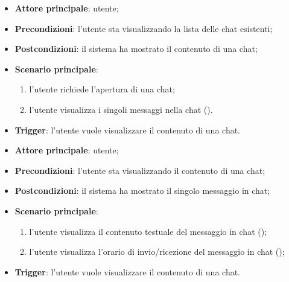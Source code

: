 \documentclass[10pt, a4paper]{article}
\begin{document}
    \begin{itemize}
        \item \textbf{Attore principale}: utente;
        \item \textbf{Precondizioni}: l’utente sta visualizzando la lista delle chat esistenti;
        \item \textbf{Postcondizioni}: il sistema ha mostrato il contenuto di una chat;
        \item \textbf{Scenario principale}:
            \begin{enumerate}
                \item l’utente richiede l’apertura di una chat;
                \item l'utente visualizza i singoli messaggi nella chat ().
            \end{enumerate}
        \item \textbf{Trigger}: l’utente vuole visualizzare il contenuto di una chat.
    \end{itemize}

    \begin{itemize}
        \item \textbf{Attore principale}: utente;
        \item \textbf{Precondizioni}: l’utente sta visualizzando il contenuto di una chat;
        \item \textbf{Postcondizioni}: il sistema ha mostrato il singolo messaggio in chat;
        \item \textbf{Scenario principale}:
            \begin{enumerate}
                \item l’utente visualizza il contenuto testuale del messaggio in chat ();
                \item l’utente visualizza l'orario di invio/ricezione del messaggio in chat ();
            \end{enumerate}
        \item \textbf{Trigger}: l’utente vuole visualizzare il contenuto di una chat.
    \end{itemize}
\end{document}
